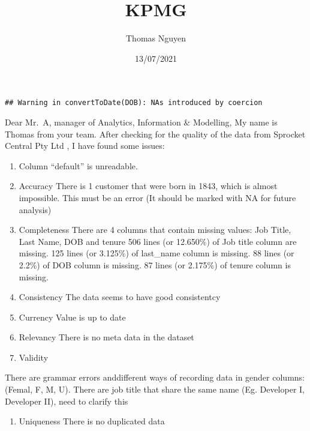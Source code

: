 \documentclass[
]{article}
\title{KPMG}
\author{Thomas Nguyen}
\date{13/07/2021}
\providecommand{\tightlist}{%
  \setlength{\itemsep}{0pt}\setlength{\parskip}{0pt}}
\begin{document}
\maketitle

\begin{verbatim}
## Warning in convertToDate(DOB): NAs introduced by coercion
\end{verbatim}

Dear Mr.~A, manager of Analytics, Information \& Modelling, My name is
Thomas from your team. After checking for the quality of the data from
Sprocket Central Pty Ltd , I have found some issues:

\begin{enumerate}
\def\labelenumi{\arabic{enumi}.}
\item
  Column ``default'' is unreadable.
\item
  Accuracy There is 1 customer that were born in 1843, which is almost
  impossible. This must be an error (It should be marked with NA for
  future analysis)
\item
  Completeness There are 4 columns that contain missing values: Job
  Title, Last Name, DOB and tenure 506 lines (or 12.650\%) of Job title
  column are missing. 125 lines (or 3.125\%) of last\_name column is
  missing. 88 lines (or 2.2\%) of DOB column is missing. 87 lines (or
  2.175\%) of tenure column is missing.
\item
  Consistency The data seems to have good consistentcy
\item
  Currency Value is up to date
\item
  Relevancy There is no meta data in the dataset
\item
  Validity
\end{enumerate}

There are grammar errors anddifferent ways of recording data in gender
columns: (Femal, F, M, U). There are job title that share the same name
(Eg. Developer I, Developer II), need to clarify this

\begin{enumerate}
\def\labelenumi{\arabic{enumi}.}
\setcounter{enumi}{7}
\tightlist
\item
  Uniqueness There is no duplicated data
\end{enumerate}
\end{document}
